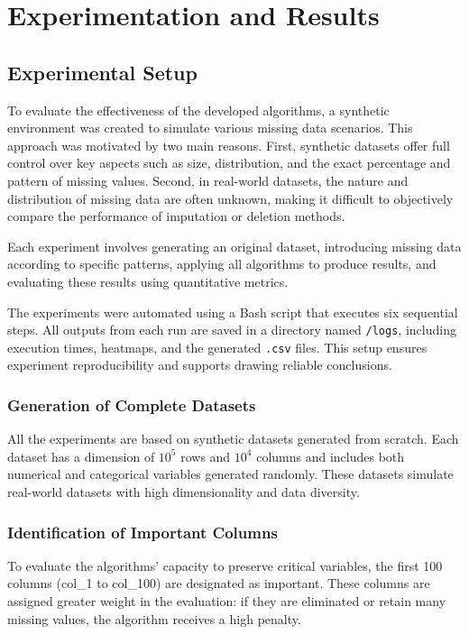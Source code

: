 \documentclass[a4paper,12pt]{article}
\begin{document}
\newpage
\section{Experimentation and Results}

\subsection{Experimental Setup}
To evaluate the effectiveness of the developed algorithms, a synthetic environment was created to simulate various missing data scenarios. This approach was motivated by two main reasons. First, synthetic datasets offer full control over key aspects such as size, distribution, and the exact percentage and pattern of missing values. Second, in real-world datasets, the nature and distribution of missing data are often unknown, making it difficult to objectively compare the performance of imputation or deletion methods.

Each experiment involves generating an original dataset, introducing missing data according to specific patterns, applying all algorithms to produce results, and evaluating these results using quantitative metrics.

The experiments were automated using a Bash script that executes six sequential steps. All outputs from each run are saved in a directory named \texttt{/logs}, including execution times, heatmaps, and the generated \texttt{.csv} files. This setup ensures experiment reproducibility and supports drawing reliable conclusions.

\subsubsection{Generation of Complete Datasets}
All the experiments are based on synthetic datasets generated from scratch. Each dataset has a dimension of $10^5$ rows and $10^4$ columns and includes both numerical and categorical variables generated randomly. These datasets simulate real-world datasets with high dimensionality and data diversity.

\subsubsection{Identification of Important Columns} 
To evaluate the algorithms' capacity to preserve critical variables, the first 100 columns (col\_1 to col\_100) are designated as important. These columns are assigned greater weight in the evaluation: if they are eliminated or retain many missing values, the algorithm receives a high penalty.
\end{document}
